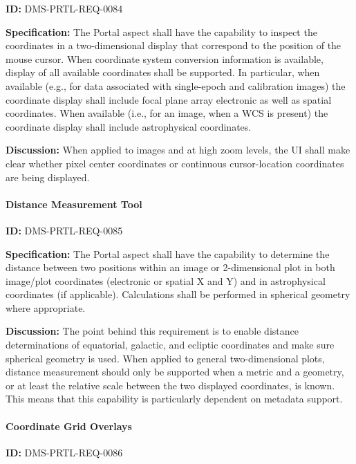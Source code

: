 \documentclass[SE,toc,lsstdraft]{lsstdoc}
\begin{document}
\label{DMS-PRTL-REQ-0084}
\textbf{ID:} DMS-PRTL-REQ-0084

\textbf{Specification:}
The Portal aspect shall have the capability to inspect the coordinates in a two-dimensional display that correspond to the position of the mouse cursor.  When coordinate system conversion information is available, display of all available coordinates shall be supported.  In particular, when available (e.g., for data associated with single-epoch and calibration images) the coordinate display shall include focal plane array electronic as well as  spatial coordinates.  When available (i.e., for an image, when a WCS is present) the coordinate display shall include astrophysical coordinates.

\textbf{Discussion:}
When applied to images and at high zoom levels, the UI shall make clear whether pixel center coordinates or continuous cursor-location coordinates are being displayed.

\paragraph{Distance Measurement Tool}\hfill  %

\label{DMS-PRTL-REQ-0085}
\textbf{ID:} DMS-PRTL-REQ-0085

\textbf{Specification:}
The Portal aspect shall have the capability to determine the distance between two positions within an image or 2-dimensional plot in both image/plot coordinates (electronic or spatial X and Y) and in astrophysical coordinates (if applicable).  Calculations shall be performed in spherical geometry where appropriate.

\textbf{Discussion:}
The point behind this requirement is to enable distance determinations of equatorial, galactic, and ecliptic coordinates and make sure spherical geometry is used.
When applied to general two-dimensional plots, distance measurement should only be supported when a metric and a geometry, or at least the relative scale between the two displayed coordinates, is known.
This means that this capability is particularly dependent on metadata support.

\paragraph{Coordinate Grid Overlays}\hfill  %

\label{DMS-PRTL-REQ-0086}
\textbf{ID:} DMS-PRTL-REQ-0086
\end{document}
